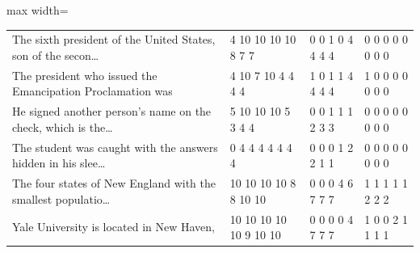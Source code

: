 \begin{table}[t]
\begin{adjustbox}{max width=\textwidth}
\begin{tabular}{p{7cm}lll}
The sixth president of the United States, son of the secon\ldots & 4 10 10 10 10 8 7 7 & 0 0 1 0 4 4 4 4 & 0 0 0 0 0 0 0 0 \\
The president who issued the Emancipation Proclamation was & 4 10 7 10 4 4 4 4 & 1 0 1 1 4 4 4 4 & 1 0 0 0 0 0 0 0 \\
He signed another person's name on the check, which is the\ldots & 5 10 10 10 5 3 4 4 & 0 0 1 1 1 2 3 3 & 0 0 0 0 0 0 0 0 \\
The student was caught with the answers hidden in his slee\ldots & 0 4 4 4 4 4 4 4 & 0 0 0 1 2 2 1 1 & 0 0 0 0 0 0 0 0 \\
The four states of New England with the smallest populatio\ldots & 10 10 10 10 8 8 10 10 & 0 0 0 4 6 7 7 7 & 1 1 1 1 1 2 2 2 \\
Yale University is located in New Haven, & 10 10 10 10 10 9 10 10 & 0 0 0 0 4 7 7 7 & 1 0 0 2 1 1 1 1 \\
\bottomrule
\end{tabular}
\end{adjustbox}
\end{table}